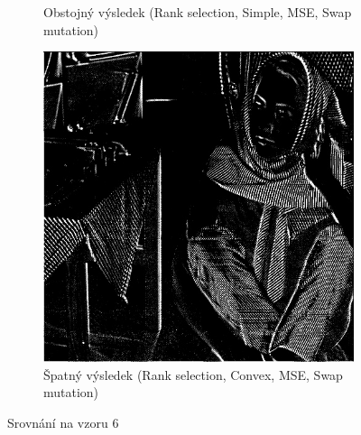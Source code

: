 \documentclass[a4paper,11pt]{scrartcl}
\begin{document}
\begin{figure}[!h]
\begin{subfigure}[b]{0.32\textwidth}
        \caption{Obstojný výsledek (Rank selection, Simple, MSE, Swap mutation)}
        \label{fig:ex62}
    \end{subfigure}
    \begin{subfigure}[b]{0.32\textwidth}
        \includegraphics[width=\textwidth]{img/ranksel-convex-mse-swap_example6.jpg}
        \caption{Špatný výsledek (Rank selection, Convex, MSE, Swap mutation)}
        \label{fig:ex63}
    \end{subfigure}
    \caption{Srovnání na vzoru 6}
    \label{porovnani_ex6}
\end{figure}
\end{document}
